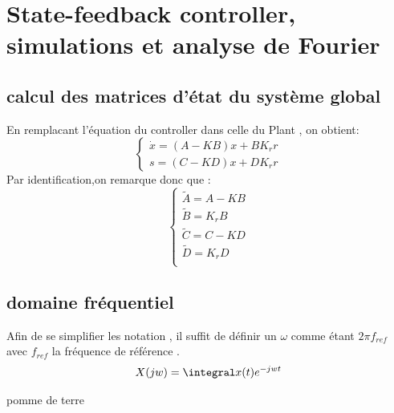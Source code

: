 \documentclass[11pt,a4paper]{article}
\begin{document}
\section{State-feedback controller, simulations et analyse de Fourier}
\subsection{}
\subsection{calcul des matrices d'état du système global}
En remplacant l'équation du controller dans celle du Plant , on obtient:
\begin{equation}
\begin{cases}
\dot x= (A-KB)x+BK_rr \\
s= (C-KD)x+DK_rr
\end{cases}
\end{equation}
Par identification,on remarque donc que : \\
\begin{equation}
\begin{cases}

\tilde{A} = A-KB \\
\tilde{B} = K_rB \\
\tilde{C} = C-KD \\
\tilde{D} = K_rD \\

\end{cases}
\end{equation}
\subsection{domaine fréquentiel}
Afin de se simplifier les notation , il suffit de définir un $\omega$ comme étant $2\pi f_{ref}$ avec $f_{ref}$ la fréquence de référence . 
\begin{equation}
  X(jw)=\integral x(t) e^{-jwt}
\end{equation}
  
pomme de terre 
\end{document}
